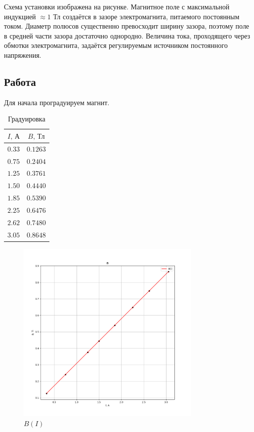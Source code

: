 \documentclass[a4paper, 12pt]{article}
\begin{document}
\raggedright
Схема установки изображена на рисунке. Магнитное поле с максимальной индукцией
$\approx 1$ Тл создаётся в зазоре электромагнита, питаемого
постоянным током. Диаметр полюсов существенно превосходит шири­ну зазора,
поэтому поле в средней части зазора достаточно однородно.
Величина тока, проходящего через обмотки электромагнита, задаётся
регулируемым источником постоянного напряжения.

\newpage

\centering
\subsection*{Работа}

\raggedright

Для начала проградуируем магнит.

\begin{table}[htbp]
    \centering
    \begin{tabular}{|c|c|}
    \hline
    $I, \, \text{А}$ & $B, \, \text{Тл}$ \\ \hline
    $ 0.33 $ & $ 0.1263 $ \\ \hline
    $ 0.75 $ & $ 0.2404 $ \\ \hline
    $ 1.25 $ & $ 0.3761 $ \\ \hline
    $ 1.50 $ & $ 0.4440 $ \\ \hline
    $ 1.85 $ & $ 0.5390 $ \\ \hline
    $ 2.25 $ & $ 0.6476 $ \\ \hline
    $ 2.62 $ & $ 0.7480 $ \\ \hline
    $ 3.05 $ & $ 0.8648 $ \\ \hline
    \end{tabular}
    \caption{Градуировка}
\end{table}

\begin{figure}[H]
   \centering
   \includegraphics[width=0.8\textwidth]{img/B(I).png}
   \caption{$B(I)$}
\end{figure}
\end{document}
